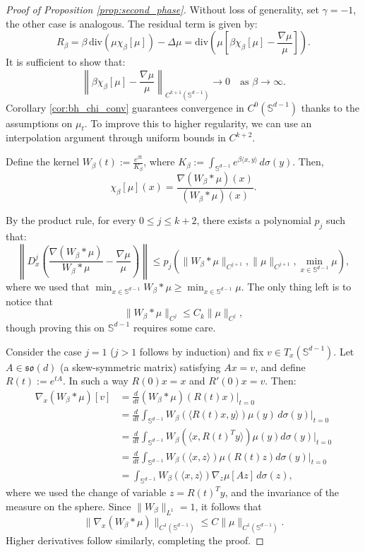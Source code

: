 \documentclass{article}
\numberwithin{theorem}{section}
\begin{document}
\begin{proof}[Proof of Proposition \ref{prop:second_phase}]
Without loss of generality, set $\gamma = -1$, the other case is analogous. The residual term is given by:
\[
R_\beta = \beta \, \mathrm{div}(\mu \chi_\beta[\mu]) - \Delta \mu = \mathrm{div}\left(\mu \left[\beta \chi_\beta[\mu] - \frac{\nabla \mu}{\mu}\right] \right).
\]
It is sufficient to show that:
\[
\left\| \beta \chi_\beta[\mu] - \frac{\nabla \mu}{\mu} \right\|_{C^{k +1}(\mathbb{S}^{d-1})} \to 0 \quad \text{as } \beta \to \infty.
\]
Corollary \ref{cor:bh_chi_conv} guarantees convergence in $C^0(\mathbb{S}^{d-1})$ thanks to the assumptions on $\mu_t$. To improve this to higher regularity, we can use an interpolation argument
through uniform bounds in $C^{k+2}$.

Define the kernel \( W_\beta(t) := \frac{e^{\beta t}}{K_\beta} \), where \( K_\beta := \int_{\mathbb{S}^{d-1}} e^{\beta \langle x, y \rangle} \, d\sigma(y) \). Then,
\[
\chi_\beta[\mu](x) = \frac{\nabla (W_\beta * \mu)(x)}{(W_\beta * \mu)(x)}.
\]

By the product rule, for every $0\leq j \leq k+2$, there exists a polynomial \( p_j \) such that:
\[
\left\| D^j_x \left( \frac{\nabla (W_\beta * \mu)}{W_\beta * \mu} - \frac{\nabla \mu}{\mu} \right) \right\| \leq p_j\left(\|W_\beta * \mu\|_{C^{j+1}}, \|\mu\|_{C^{j+1}}, \min_{x\in\mathbb{S}^{d-1}} \mu\right),
\]
where we used that $\min_{x\in\mathbb{S}^{d-1}} W_\beta * \mu\geq \min_{x\in\mathbb{S}^{d-1}} \mu $.
The only thing left is to notice that
\[
\| W_\beta * \mu \|_{C^j} \leq C_k \| \mu \|_{C^j},
\]
though proving this on \( \mathbb{S}^{d-1} \) requires some care.

Consider the case \( j = 1 \) ($j>1$ follows by induction) and fix \( v \in T_x(\mathbb{S}^{d-1}) \). Let \( A \in \mathfrak{so}(d) \) (a skew-symmetric matrix) satisfying \( A x = v \), and define \( R(t) := e^{tA} \). In such a way $R(0)x=x$ and $R'(0) x= v$. Then:
\[
\begin{aligned}\nabla_x (W_\beta * \mu)[v] &= \frac{d}{dt}(W_\beta * \mu)(R(t)x)\Big|_{t=0} \\
&= \frac{d}{dt} \int_{\mathbb{S}^{d-1}} W_\beta(\langle R(t)x, y \rangle) \mu(y) \, d\sigma(y)\Big|_{t=0} \\
&=\frac{d}{dt}\int_{\mathbb{S}^{d-1}} W_\beta(\langle x,R(t)^T y\rangle) \mu(y) d\sigma(y)|_{t=0} \\
&=\frac{d}{dt} \int_{\mathbb{S}^{d-1}}  W_\beta(\langle x, z \rangle) \mu(R(t) z ) d\sigma(y)|_{t=0} \\
&= \int_{\mathbb{S}^{d-1}} W_\beta(\langle x, z \rangle) \nabla_z \mu[A z] \, d\sigma(z),
\end{aligned}
\]
where we used the change of variable \( z = R(t)^T y \), and the invariance of the measure on the sphere. Since \( \|W_\beta\|_{L^1} = 1 \), it follows that
\[
\| \nabla_x(W_\beta * \mu) \|_{C^1(\mathbb{S}^{d-1})} \leq C \| \mu \|_{C^1(\mathbb{S}^{d-1})}.
\]
Higher derivatives follow similarly, completing the proof.
\end{proof}
\end{document}
